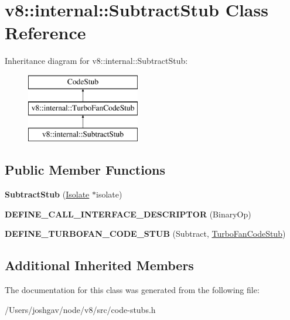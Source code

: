 \hypertarget{classv8_1_1internal_1_1_subtract_stub}{}\section{v8\+:\+:internal\+:\+:Subtract\+Stub Class Reference}
\label{classv8_1_1internal_1_1_subtract_stub}
Inheritance diagram for v8\+:\+:internal\+:\+:Subtract\+Stub\+:\begin{figure}[H]
\begin{center}
\leavevmode
\includegraphics[height=3.000000cm]{classv8_1_1internal_1_1_subtract_stub}
\end{center}
\end{figure}
\subsection*{Public Member Functions}
\begin{DoxyCompactItemize}
\item 
{\bfseries Subtract\+Stub} (\hyperlink{classv8_1_1internal_1_1_isolate}{Isolate} $\ast$isolate)\hypertarget{classv8_1_1internal_1_1_subtract_stub_a09a32db4b64bdd47177c84a9eb81433e}{}\label{classv8_1_1internal_1_1_subtract_stub_a09a32db4b64bdd47177c84a9eb81433e}

\item 
{\bfseries D\+E\+F\+I\+N\+E\+\_\+\+C\+A\+L\+L\+\_\+\+I\+N\+T\+E\+R\+F\+A\+C\+E\+\_\+\+D\+E\+S\+C\+R\+I\+P\+T\+OR} (Binary\+Op)\hypertarget{classv8_1_1internal_1_1_subtract_stub_a6fa7a7aac41e1be4c229fa35d3a59da3}{}\label{classv8_1_1internal_1_1_subtract_stub_a6fa7a7aac41e1be4c229fa35d3a59da3}

\item 
{\bfseries D\+E\+F\+I\+N\+E\+\_\+\+T\+U\+R\+B\+O\+F\+A\+N\+\_\+\+C\+O\+D\+E\+\_\+\+S\+T\+UB} (Subtract, \hyperlink{classv8_1_1internal_1_1_turbo_fan_code_stub}{Turbo\+Fan\+Code\+Stub})\hypertarget{classv8_1_1internal_1_1_subtract_stub_a5bad3a64a2c633ca3d58597a506171fc}{}\label{classv8_1_1internal_1_1_subtract_stub_a5bad3a64a2c633ca3d58597a506171fc}

\end{DoxyCompactItemize}
\subsection*{Additional Inherited Members}


The documentation for this class was generated from the following file\+:\begin{DoxyCompactItemize}
\item 
/\+Users/joshgav/node/v8/src/code-\/stubs.\+h\end{DoxyCompactItemize}
